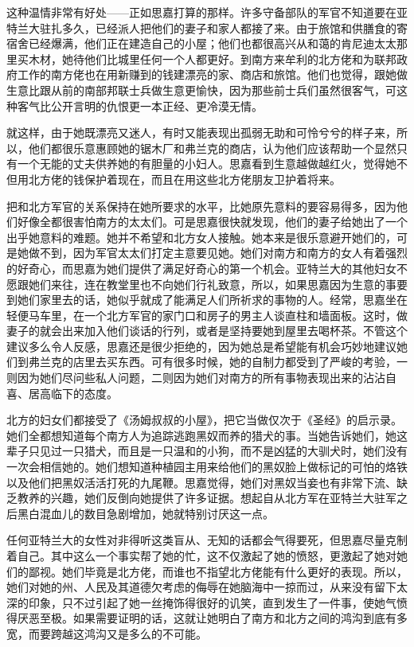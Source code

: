 \par 这种温情非常有好处——正如思嘉打算的那样。许多守备部队的军官不知道要在亚特兰大驻扎多久，已经派人把他们的妻子和家人都接了来。由于旅馆和供膳食的寄宿舍已经爆满，他们正在建造自己的小屋；他们也都很高兴从和蔼的肯尼迪太太那里买木材，她待他们比城里任何一个人都更好。到南方来牟利的北方佬和为联邦政府工作的南方佬也在用新赚到的钱建漂亮的家、商店和旅馆。他们也觉得，跟她做生意比跟从前的南部邦联士兵做生意更愉快，因为那些前士兵们虽然很客气，可这种客气比公开言明的仇恨更一本正经、更冷漠无情。
\par 就这样，由于她既漂亮又迷人，有时又能表现出孤弱无助和可怜兮兮的样子来，所以，他们都很乐意惠顾她的锯木厂和弗兰克的商店，认为他们应该帮助一个显然只有一个无能的丈夫供养她的有胆量的小妇人。思嘉看到生意越做越红火，觉得她不但用北方佬的钱保护着现在，而且在用这些北方佬朋友卫护着将来。
\par 把和北方军官的关系保持在她所要求的水平，比她原先意料的要容易得多，因为他们好像全都很害怕南方的太太们。可是思嘉很快就发现，他们的妻子给她出了一个出乎她意料的难题。她并不希望和北方女人接触。她本来是很乐意避开她们的，可是她做不到，因为军官太太们打定主意要见她。她们对南方和南方的女人有着强烈的好奇心，而思嘉为她们提供了满足好奇心的第一个机会。亚特兰大的其他妇女不愿跟她们来往，连在教堂里也不向她们行礼致意，所以，如果思嘉因为生意的事要到她们家里去的话，她似乎就成了能满足人们所祈求的事物的人。经常，思嘉坐在轻便马车里，在一个北方军官的家门口和房子的男主人谈直柱和墙面板。这时，做妻子的就会出来加入他们谈话的行列，或者是坚持要她到屋里去喝杯茶。不管这个建议多么令人反感，思嘉还是很少拒绝的，因为她总是希望能有机会巧妙地建议她们到弗兰克的店里去买东西。可有很多时候，她的自制力都受到了严峻的考验，一则因为她们尽问些私人问题，二则因为她们对南方的所有事物表现出来的沾沾自喜、居高临下的态度。
\par 北方的妇女们都接受了《汤姆叔叔的小屋》，把它当做仅次于《圣经》的启示录。她们全都想知道每个南方人为追踪逃跑黑奴而养的猎犬的事。当她告诉她们，她这辈子只见过一只猎犬，而且是一只温和的小狗，而不是凶猛的大驯犬时，她们没有一次会相信她的。她们想知道种植园主用来给他们的黑奴脸上做标记的可怕的烙铁以及他们把黑奴活活打死的九尾鞭。思嘉觉得，她们对黑奴当妾也有非常下流、缺乏教养的兴趣，她们反倒向她提供了许多证据。想起自从北方军在亚特兰大驻军之后黑白混血儿的数目急剧增加，她就特别讨厌这一点。
\par 任何亚特兰大的女性对非得听这类盲从、无知的话都会气得要死，但思嘉尽量克制着自己。其中这么一个事实帮了她的忙，这不仅激起了她的愤怒，更激起了她对她们的鄙视。她们毕竟是北方佬，而谁也不指望北方佬能有什么更好的表现。所以，她们对她的州、人民及其道德欠考虑的侮辱在她脑海中一掠而过，从来没有留下太深的印象，只不过引起了她一丝掩饰得很好的讥笑，直到发生了一件事，使她气愤得厌恶至极。如果需要证明的话，这就让她明白了南方和北方之间的鸿沟到底有多宽，而要跨越这鸿沟又是多么的不可能。
